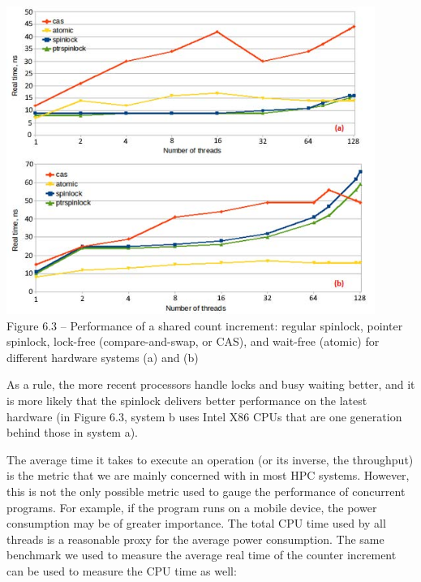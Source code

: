 \hspace*{\fill} \\ %
\begin{center}
\includegraphics[width=0.9\textwidth]{content/2/chapter6/images/3.jpg}\\
Figure 6.3 – Performance of a shared count increment: regular spinlock, pointer spinlock, lock-free (compare-and-swap, or CAS), and wait-free (atomic) for different hardware systems (a) and (b)
\end{center}

As a rule, the more recent processors handle locks and busy waiting better, and it is more likely that the spinlock delivers better performance on the latest hardware (in Figure 6.3, system b uses Intel X86 CPUs that are one generation behind those in system a).

The average time it takes to execute an operation (or its inverse, the throughput) is the metric that we are mainly concerned with in most HPC systems. However, this is not the only possible metric used to gauge the performance of concurrent programs. For example, if the program runs on a mobile device, the power consumption may be of greater importance. The total CPU time used by all threads is a reasonable proxy for the average power consumption. The same benchmark we used to measure the average real time of the counter increment can be used to measure the CPU time as well:

